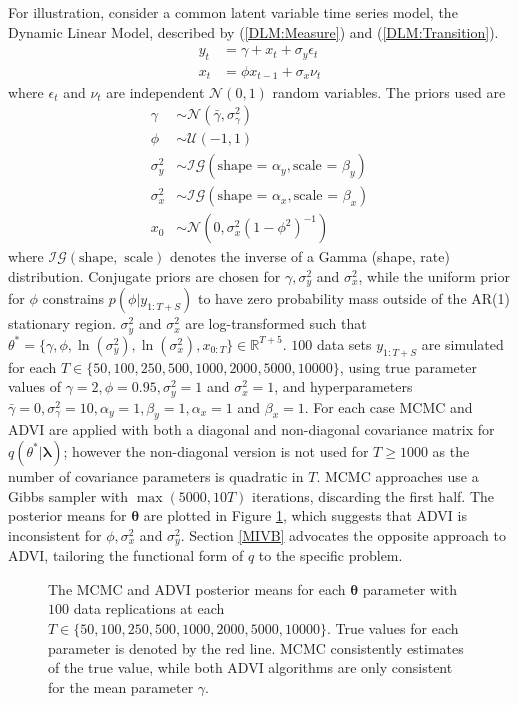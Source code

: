 \documentclass[12pt,a4paper]{article}%
\numberwithin{equation}{section}
\begin{document}
For illustration, consider a common latent variable time series model, the Dynamic Linear Model, described by (\ref{DLM:Measure}) and (\ref{DLM:Transition}).
\begin{align}
y_t &= \gamma + x_t + \sigma_y \epsilon_t \label{DLM:Measure}\\
x_t &= \phi x_{t-1} + \sigma_x \nu_t \label{DLM:Transition}
\end{align}
where $\epsilon_t$ and $\nu_t$ are independent $\mathcal{N}(0, 1)$ random variables. The priors used are
\begin{align}
\gamma &\sim \mathcal{N}(\bar{\gamma}, \sigma^2_{\gamma}) \\
\phi &\sim \mathcal{U}(-1, 1) \\
\sigma^2_y &\sim \mathcal{IG}(\mbox{shape = }\alpha_y, \mbox{scale = }\beta_y) \\
\sigma^2_x &\sim \mathcal{IG}(\mbox{shape = }\alpha_x, \mbox{scale = }\beta_x) \\
x_0 &\sim \mathcal{N}(0, \sigma^2_x(1 - \phi^2)^{-1})
\end{align}
where $\mathcal{IG}(\mbox{shape}, \mbox{ scale})$ denotes the inverse of a Gamma (shape, rate) distribution. Conjugate priors are chosen for $\gamma, \sigma^2_y$ and $\sigma^2_x$, while the uniform prior for $\phi$ constrains $p(\phi | y_{1:T+S})$ to have zero probability mass outside of the AR(1) stationary region. $\sigma^2_y$ and $\sigma^2_x$ are log-transformed such that $\theta^* = \{\gamma, \phi, \ln(\sigma^2_y), \ln(\sigma^2_x), x_{0:T}\} \in \mathbb{R}^{T+5}$. $100$ data sets $y_{1:T+S}$ are simulated for each $T \in \{50, 100, 250, 500, 1000, 2000, 5000, 10000\}$, using true parameter values of $\gamma = 2, \phi = 0.95, \sigma^2_y = 1$ and $\sigma^2_x=1$, and hyperparameters $\bar{\gamma} = 0, \sigma^2_{\gamma} = 10, \alpha_y = 1, \beta_y = 1, \alpha_x = 1$ and $\beta_x = 1$. For each case MCMC and ADVI are applied with both a diagonal and non-diagonal covariance matrix for $q(\theta^* | \boldsymbol{\lambda})$; however the non-diagonal version is not used for $T \geq 1000$ as the number of covariance parameters is quadratic in $T$. MCMC approaches use a Gibbs sampler with $\max(5000, 10T)$ iterations, discarding the first half. The posterior means for $\boldsymbol{\theta}$ are plotted in Figure \ref{fig:DLM:ADVI}, which suggests that ADVI is inconsistent for $\phi, \sigma^2_x$ and $\sigma^2_y$. Section \ref{MIVB} advocates the opposite approach to ADVI, tailoring the functional form of $q$ to the specific problem.

\begin{figure}[h]
\centering
\caption{The MCMC and ADVI posterior means for each $\boldsymbol{\theta}$ parameter with $100$ data replications at each $T \in \{50, 100, 250, 500, 1000, 2000, 5000, 10000\}$. True values for each parameter is denoted by the red line. MCMC consistently estimates of the true value, while both ADVI algorithms are only consistent for the mean parameter $\gamma$.
}
\label{fig:DLM:ADVI}
\end{figure}
\end{document}

